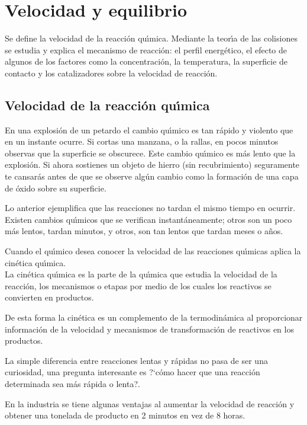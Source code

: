 \chapter{Velocidad y equilibrio}

Se define la velocidad de la reacci\'on qu\'{\i}mica. Mediante la teor\'{\i}a de las co\-lisiones se estudia y explica el mecanismo de reacci\'on: el perfil energ\'etico, el efecto de algunos de los factores como la concentraci\'on, la temperatura, la superficie de contacto y los catalizadores sobre la velocidad de reacci\'on.
\section{Velocidad de la reacci\'on qu\'{\i}mica}
En una explosi\'on de un petardo el cambio qu\'{\i}mico es tan r\'apido y violento que en un instante ocurre. Si cortas una manzana, o la rallas, en pocos minutos observas que la superficie se obscurece. Este cambio qu\'{\i}mico es m\'as lento que la explosi\'on. Si ahora sostienes un objeto de hierro (sin recubri\-miento) seguramente te cansar\'as antes de que se observe alg\'un cambio como la formaci\'on de una capa de \'oxido sobre su superficie.

Lo anterior ejemplifica que las reacciones no tardan el mismo tiempo en ocurrir. Existen cambios qu\'{\i}micos que se verifican instant\'aneamente; otros son un poco m\'as lentos, tardan minutos, y otros, son tan lentos que tardan meses o a\~nos. 

Cuando el qu\'{\i}mico desea conocer la velocidad de las reacciones qu\'{\i}micas aplica la cin\'etica qu\'{\i}mica.\\ 
La cin\'etica qu\'{\i}mica  es la parte de la qu\'{\i}mica que estudia la velocidad de la reacci\'on, los mecanismos o etapas por medio de los cuales los reactivos se convierten en productos.

De esta forma la cin\'etica es un complemento de la termodin\'amica al proporcionar informaci\'on de la velocidad y mecanismos de transformaci\'on de reactivos en los productos.

 La simple diferencia entre reacciones lentas y r\'apidas no pasa de ser una curiosidad, una pregunta interesante es ?`c\'omo hacer que una reacci\'on determinada sea m\'as r\'apida o lenta?.

En la industria se tiene algunas ventajas al aumentar la velocidad de reacci\'on y obtener una tonelada de producto en 2 minutos en vez de 8 horas.

